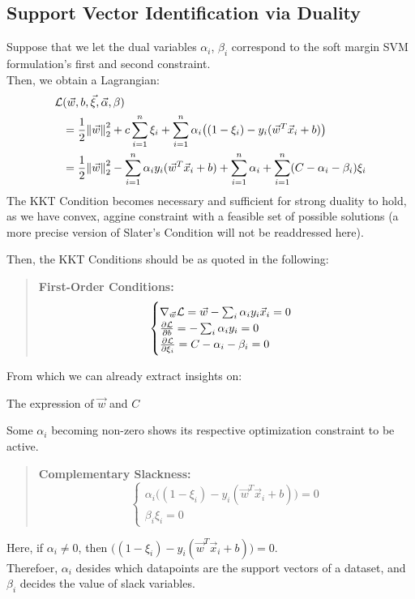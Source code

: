\subsection{Support Vector Identification via Duality}
Suppose that we let the dual variables $\alpha_i$, $\beta_i$ correspond to the soft margin SVM formulation's first and second constraint. \\
Then, we obtain a Lagrangian:
\begin{align*}
    \mathcal{L} &(\vec{w}, b, \vec{\xi}, \vec{\alpha}, \beta) \\
    &= \frac{1}{2} \pnorm[2]{\vec{w}}{2} + c \sum_{i = 1}^n \xi_i + \sum_{i = 1}^n \alpha_i \big( (1 - \xi_i) - y_i (\vec{w}^T \vec{x}_i + b) \big) \\
    &= \frac{1}{2} \pnorm[2]{\vec{w}}{2} - \sum_{i=1}^n \alpha_i y_i (\vec{w}^T \vec{x}_i + b) + \sum_{i = 1}^n \alpha_i + \sum_{i = 1}^n (C - \alpha_i - \beta_i) \xi_i
\end{align*}
The KKT Condition becomes necessary and sufficient for strong duality to hold, as we have convex, aggine constraint with a feasible set of possible solutions (a more precise version of Slater's Condition will not be readdressed here).

Then, the KKT Conditions should be as quoted in the following:
\begin{quote}
    \textbf{First-Order Conditions:}
    \[
        \begin{cases}
            \nabla_{\vec{w}} \mathcal{L} = \vec{w} - \sum_i \alpha_i y_i \vec{x}_i = 0 \\
            \pdv{\mathcal{L}}{b} = -\sum_i \alpha_i y_i = 0 \\
            \pdv{\mathcal{L}}{\xi_i} = C - \alpha_i - \beta_i = 0
        \end{cases}
    \]
\end{quote}
From which we can already extract insights on:
\begin{bindenum}
    \item The expression of $\vec{w}$ and $C$
    \item Some $\alpha_i$ becoming non-zero shows its respective optimization constraint to be active.
\end{bindenum}
\begin{quote}
    \textbf{Complementary Slackness:}
    \[
        \begin{cases}
            \alpha_i \big( (1 - \xi_i) - y_i (\vec{w}^T \vec{x}_i + b) \big) = 0 \\
            \beta_i \xi_i = 0
        \end{cases}
    \]
\end{quote}
Here, if $\alpha_i \neq 0$, then $\big( (1 - \xi_i) - y_i (\vec{w}^T \vec{x}_i + b) \big) = 0$. \\
Therefoer, $\alpha_i$ desides which datapoints are the support vectors of a dataset, and $\beta_i$ decides the value of slack variables.
